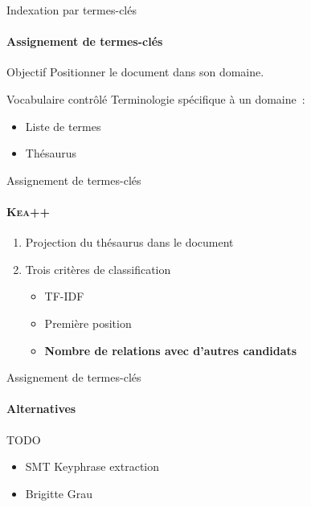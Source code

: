 \begin{frame}{Indexation par termes-clés}\framesubtitle{Assignement de termes-clés}
  \begin{block}{Objectif}
    Positionner le document dans son domaine.
  \end{block}

  \begin{block}{Vocabulaire contrôlé}
    Terminologie spécifique à un domaine~:
    \begin{itemize}
      \item{Liste de termes}
      \item{Thésaurus}
    \end{itemize}
  \end{block}
\end{frame}

\begin{frame}{Assignement de termes-clés}\framesubtitle{\textsc{Kea}++~\cite{medelyan2006kea++}}
  \begin{enumerate}
    \item{Projection du thésaurus dans le document}
    \item{Trois critères de classification}
    \begin{itemize}
      \item{TF-IDF}
      \item{Première position}
      \item{\textbf{Nombre de relations avec d'autres candidats}}
    \end{itemize}
  \end{enumerate}
\end{frame}

\begin{frame}{Assignement de termes-clés}\framesubtitle{Alternatives}
  \begin{alertblock}{TODO}
    \begin{itemize}
      \item{SMT Keyphrase extraction}
      \item{Brigitte Grau}
    \end{itemize}
  \end{alertblock}
\end{frame}

